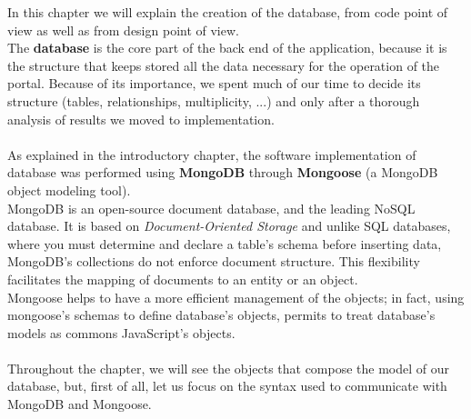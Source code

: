 \newcommand{\NWtarget}[2]{#2}
\newcommand{\NWlink}[2]{#2}
\newcommand{\NWtxtMacroDefBy}{Fragment defined by}
\newcommand{\NWtxtMacroRefIn}{Fragment referenced in}
\newcommand{\NWtxtMacroNoRef}{Fragment never referenced}
\newcommand{\NWtxtDefBy}{Defined by}
\newcommand{\NWtxtRefIn}{Referenced in}
\newcommand{\NWtxtNoRef}{Not referenced}
\newcommand{\NWtxtFileDefBy}{File defined by}
\newcommand{\NWtxtIdentsUsed}{Uses:}
\newcommand{\NWtxtIdentsNotUsed}{Never used}
\newcommand{\NWtxtIdentsDefed}{Defines:}
\newcommand{\NWsep}{${\diamond}$}
\newcommand{\NWnotglobal}{(not defined globally)}
\newcommand{\NWuseHyperlinks}{}




In this chapter we will explain the creation of the database, from code point of view as well as from design point of view.
\\The \textbf{database} is the core part of the back end of the application, because it is the structure that keeps stored all the data necessary for the operation of the portal. Because of its importance, we spent much of our time to decide its structure (tables, relationships, multiplicity, ...) and only after a thorough analysis of results we moved to implementation.
\\
\\As explained in the introductory chapter, the software implementation of database was performed using \textbf{MongoDB} through \textbf{Mongoose} (a MongoDB object modeling tool).
\\MongoDB is an open-source document database, and the leading NoSQL database. It is based on \emph{Document-Oriented Storage} and unlike SQL databases, where you must determine and declare a table's schema before inserting data, MongoDB’s collections do not enforce document structure. This flexibility facilitates the mapping of documents to an entity or an object.
\\Mongoose helps to have a more efficient management of the objects; in fact, using mongoose's schemas to define database's objects, permits to treat database's models as commons JavaScript's objects.
\\
\\Throughout the chapter, we will see the objects that compose the model of our database, but, first of all, let us focus on the syntax used to communicate with MongoDB and Mongoose.

